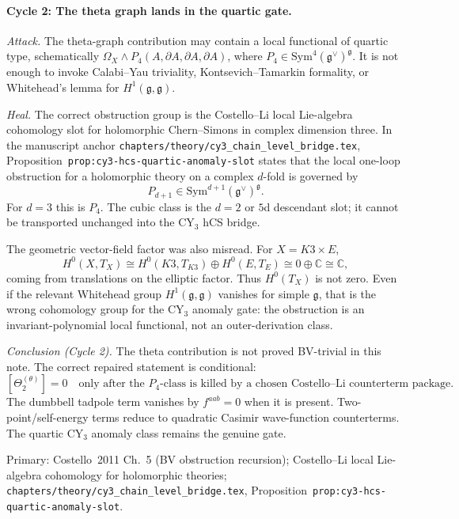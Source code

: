 \documentclass[11pt]{amsart}
\theoremstyle{definition}
\theoremstyle{remark}
\providecommand{\C}{\mathbb{C}}
\providecommand{\frakg}{\mathfrak{g}}
\providecommand{\Sym}{\mathrm{Sym}}
\begin{document}
\paragraph{Cycle 2: The theta graph lands in the quartic gate.}
\emph{Attack.}
The theta-graph contribution may contain a local functional of
quartic type, schematically
$\Omega_X \wedge P_4(A,\partial A,\partial A,\partial A)$, where
$P_4\in\Sym^4(\frakg^\vee)^\frakg$. It is not enough to invoke
Calabi--Yau triviality, Kontsevich--Tamarkin formality, or
Whitehead's lemma for $H^1(\frakg,\frakg)$.

\emph{Heal.}
The correct obstruction group is the Costello--Li local Lie-algebra
cohomology slot for holomorphic Chern--Simons in complex dimension
three. In the manuscript anchor
\texttt{chapters/theory/cy3\_chain\_level\_bridge.tex},
Proposition~\texttt{prop:cy3-hcs-quartic-anomaly-slot} states that
the local one-loop obstruction for a holomorphic theory on a complex
$d$-fold is governed by
\[
  P_{d+1}\in\Sym^{d+1}(\frakg^\vee)^\frakg .
\]
For $d=3$ this is $P_4$. The cubic class is the $d=2$ or $5$d
descendant slot; it cannot be transported unchanged into the CY$_3$
hCS bridge.

The geometric vector-field factor was also misread. For
$X=K3\times E$,
\[
  H^0(X,T_X)
  \cong H^0(K3,T_{K3})\oplus H^0(E,T_E)
  \cong 0\oplus\C
  \cong \C,
\]
coming from translations on the elliptic factor. Thus $H^0(T_X)$ is
not zero. Even if the relevant Whitehead group
$H^1(\frakg,\frakg)$ vanishes for simple $\frakg$, that is the wrong
cohomology group for the CY$_3$ anomaly gate: the obstruction is an
invariant-polynomial local functional, not an outer-derivation class.

\emph{Conclusion (Cycle 2).}
The theta contribution is not proved BV-trivial in this note. The
correct repaired statement is conditional:
\[
  [\Theta_2^{(\theta)}]=0
  \quad \text{only after the } P_4\text{-class is killed by a chosen
  Costello--Li counterterm package.}
\]
The dumbbell tadpole term vanishes by $f^{aab}=0$ when it is present.
Two-point/self-energy terms reduce to quadratic Casimir
wave-function counterterms. The quartic CY$_3$ anomaly class remains
the genuine gate.

Primary: Costello~2011 Ch.~5 (BV obstruction recursion);
Costello--Li local Lie-algebra cohomology for holomorphic theories;
\texttt{chapters/theory/cy3\_chain\_level\_bridge.tex},
Proposition~\texttt{prop:cy3-hcs-quartic-anomaly-slot}.
\end{document}
